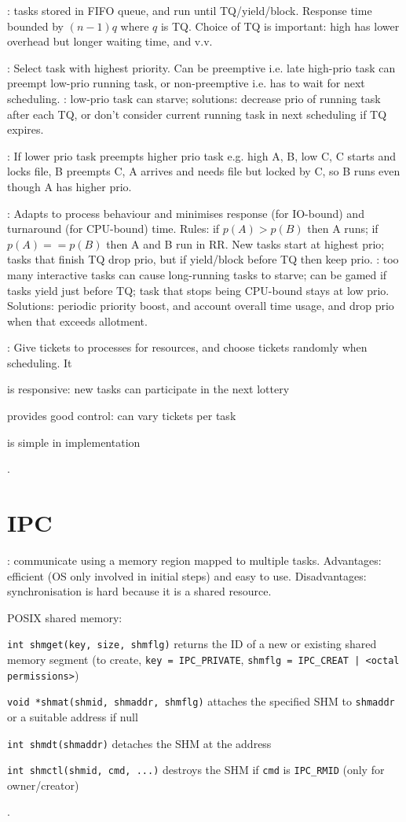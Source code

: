 \documentclass[fontsize=9pt,twoside]{slnotes}
\newcommand\problems{\textsymbol{✗}}
\begin{document}
: tasks stored in FIFO queue, and run until TQ/yield/block. Response time bounded by \((n-1)q\) where \(q\) is TQ. Choice of TQ is important: high has lower overhead but longer waiting time, and v.v.

: Select task with highest priority. Can be preemptive i.e. late high-prio task can preempt low-prio running task, or non-preemptive i.e. has to wait for next scheduling. \problems: low-prio task can starve; solutions: decrease prio of running task after each TQ, or don't consider current running task in next scheduling if TQ expires.

: If lower prio task preempts higher prio task e.g. high A, B, low C, C starts and locks file, B preempts C, A arrives and needs file but locked by C, so B runs even though A has higher prio.

: Adapts to process behaviour and minimises response (for IO-bound) and turnaround (for CPU-bound) time. Rules: if \(p(A) > p(B)\) then A runs; if \(p(A) == p(B)\) then A and B run in RR. New tasks start at highest prio; tasks that finish TQ drop prio, but if yield/block before TQ then keep prio. \problems: too many interactive tasks can cause long-running tasks to starve; can be gamed if tasks yield just before TQ; task that stops being CPU-bound stays at low prio. Solutions: periodic priority boost, and account overall time usage, and drop prio when that exceeds allotment.

: Give tickets to processes for resources, and choose tickets randomly when scheduling. It \begin{slinenum}
\item is responsive: new tasks can participate in the next lottery
\item provides good control: can vary tickets per task
\item is simple in implementation
\end{slinenum}.

\chapter{IPC}
: communicate using a memory region mapped to multiple tasks. Advantages: efficient (OS only involved in initial steps) and easy to use. Disadvantages: synchronisation is hard because it is a shared resource.

POSIX shared memory: \begin{slinenum}
\item \texttt{int shmget(key, size, shmflg)} returns the ID of a new or existing shared memory segment (to create, \texttt{key = IPC\_PRIVATE}, \texttt{shmflg = IPC\_CREAT | <octal permissions>})
\item \texttt{void *shmat(shmid, shmaddr, shmflg)} attaches the specified SHM to \texttt{shmaddr} or a suitable address if null
\item \texttt{int shmdt(shmaddr)} detaches the SHM at the address
\item \texttt{int shmctl(shmid, cmd, ...)} destroys the SHM if \texttt{cmd} is \texttt{IPC\_RMID} (only for owner/creator)
\end{slinenum}.
\end{document}
